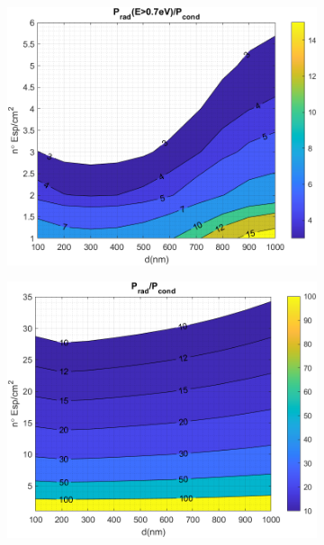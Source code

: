 \begin{figure}[H]
	\centering
	\begin{subfigure}[b]{0.49\textwidth}
		\centering
		\includegraphics[width=1.00\textwidth]{figuras/Resultados/RelacionCondRad/SiGe.png}
		\caption{ }
		\label{fig:rel_SiSiO2Ge}
	\end{subfigure}
	\hfill
	\begin{subfigure}[b]{0.49\textwidth}
		\centering
		\includegraphics[width=1.00\textwidth]{figuras/Resultados/RelacionCondRad/SiGe_full.png}
		\caption{ }

\end{subfigure}
\end{figure}
